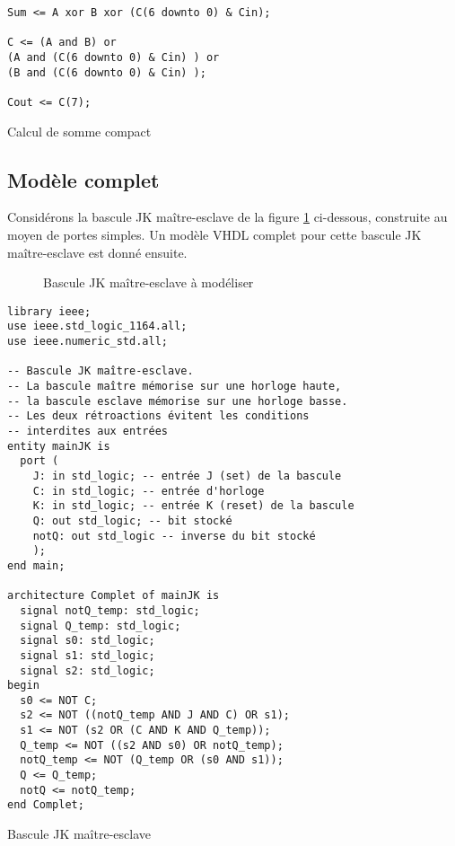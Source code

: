 \documentclass[11pt]{article}
\begin{document}
\begin{listing}[htbp]
\begin{verbatim}
Sum <= A xor B xor (C(6 downto 0) & Cin);

C <= (A and B) or
(A and (C(6 downto 0) & Cin) ) or
(B and (C(6 downto 0) & Cin) );

Cout <= C(7);
\end{verbatim}
\caption{Calcul de somme compact}
\end{listing}

\subsection{Modèle complet}
\label{sec:org66b38df}

Considérons la bascule JK maître-esclave de la figure \ref{fig:orgb05d531}
ci-dessous, construite au moyen de portes simples.  Un modèle
VHDL complet pour cette bascule JK maître-esclave est donné ensuite.

\begin{figure}[htbp]
\centering

\caption{\label{fig:orgb05d531}Bascule JK maître-esclave à modéliser}
\end{figure}


\begin{listing}[htbp]
\begin{verbatim}
library ieee;
use ieee.std_logic_1164.all;
use ieee.numeric_std.all;

-- Bascule JK maître-esclave.
-- La bascule maître mémorise sur une horloge haute, 
-- la bascule esclave mémorise sur une horloge basse. 
-- Les deux rétroactions évitent les conditions 
-- interdites aux entrées 
entity mainJK is
  port (
    J: in std_logic; -- entrée J (set) de la bascule
    C: in std_logic; -- entrée d'horloge
    K: in std_logic; -- entrée K (reset) de la bascule
    Q: out std_logic; -- bit stocké
    notQ: out std_logic -- inverse du bit stocké
    );
end main;

architecture Complet of mainJK is
  signal notQ_temp: std_logic;
  signal Q_temp: std_logic;
  signal s0: std_logic;
  signal s1: std_logic;
  signal s2: std_logic;
begin
  s0 <= NOT C;
  s2 <= NOT ((notQ_temp AND J AND C) OR s1);
  s1 <= NOT (s2 OR (C AND K AND Q_temp));
  Q_temp <= NOT ((s2 AND s0) OR notQ_temp);
  notQ_temp <= NOT (Q_temp OR (s0 AND s1));
  Q <= Q_temp;
  notQ <= notQ_temp;
end Complet;
\end{verbatim}
\caption{Bascule JK maître-esclave}
\end{listing}
\end{document}

